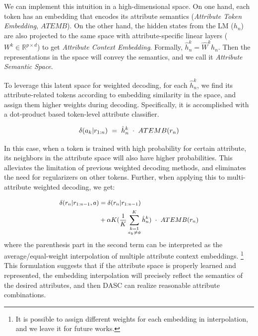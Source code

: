 We can implement this intuition in a high-dimensional space. On one hand, each token has an embedding that encodes its attribute semantics (\textit{Attribute Token Embedding}, $ATEMB$). On the other hand, the hidden states from the LM ($h_n$) are also projected to the same space with attribute-specific linear layers ($W^k \in \mathbb{R}^{p \times d}$) to get \textit{Attribute Context Embedding}. Formally, $\hat h^k_n = \hat W^k h_n$. Then the representations in the space will convey the semantics, and we call it \textit{Attribute Semantic Space}. 

To leverage this latent space for weighted decoding, for each $\hat h^k_n$, we find its attribute-related tokens according to embedding similarity in the space, and assign them higher weights during decoding. Specifically, it is accomplished with a dot-product based token-level attribute classifier.


\begin{equation}
    \small
    \delta(a_k|r_{1:n}) = \hat h^k_n \cdot ATEMB(r_n)
    \label{eqn:matching_for_logits}
\end{equation}

In this case, when a token is trained with high probability for 
certain attribute, its neighbors in the attribute space will also 
have higher probabilities. This alleviates the limitation of previous 
weighted decoding methods, and eliminates the need for regularizers on 
other tokens. Further, when applying this to multi-attribute weighted decoding, 
we get: 

\begin{equation}
    \small
    \begin{aligned}
        \delta(r_n|r_{1:n-1}, a) &= \delta(r_n|r_{1:n-1}) \\
                                 &+ \alpha K (\frac{1}{K} \sum_{\substack{k=1\\a_k\ne \phi}}^{K} \hat h^k_n) \cdot ATEMB(r_n)
    \end{aligned}
    \label{eqn:dasc_logits}
\end{equation}
where the parenthesis part in the second term can be interpreted as the average/equal-weight interpolation of multiple attribute context embeddings. 
\footnote{It is possible to assign different weights for each embedding in interpolation, and we leave it for future works.}
This formulation suggests that if the attribute space is properly learned and represented, the embedding interpolation will precisely reflect the semantics of the desired attributes, and then DASC can realize reasonable attribute combinations. 

